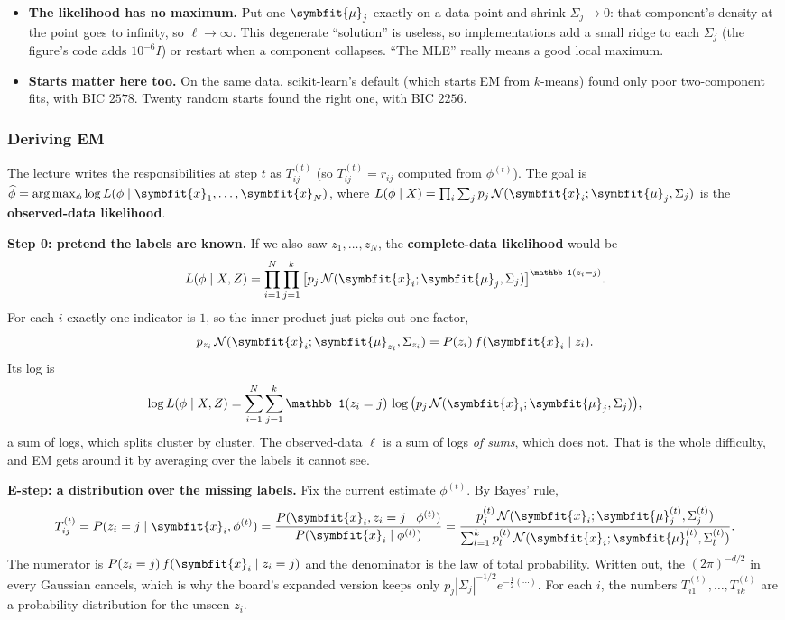 \documentclass[11pt]{article}
\newcommand{\bm}[1]{\symbfit{#1}}
\newcommand{\vx}{\bm{x}}
\begin{document}
\begin{careful}
\begin{itemize}[nosep,leftmargin=*]
\item \textbf{The likelihood has no maximum.} Put one $\bm\mu_j$ exactly on a data point and shrink $\Sigma_j\to0$: that component's density at the point goes to infinity, so $\ell\to\infty$. This degenerate ``solution'' is useless, so implementations add a small ridge to each $\Sigma_j$ (the figure's code adds $10^{-6}I$) or restart when a component collapses. ``The MLE'' really means a good local maximum.
\item \textbf{Starts matter here too.} On the same data, scikit-learn's default (which starts EM from $k$-means) found only poor two-component fits, with BIC $2578$. Twenty random starts found the right one, with BIC $2256$.
\end{itemize}
\end{careful}

\subsubsection{Deriving EM}\label{sec:emderiv}

The lecture writes the responsibilities at step $t$ as $T_{ij}^{(t)}$ (so $T_{ij}^{(t)}=r_{ij}$ computed from $\phi^{(t)}$). The goal is $\widehat\phi=\arg\max_\phi\log L(\phi\mid\vx_1,\dots,\vx_N)$, where $L(\phi\mid X)=\prod_i\sum_jp_j\,\mathcal N(\vx_i;\bm\mu_j,\Sigma_j)$ is the \textbf{observed-data likelihood}.

\textbf{Step 0: pretend the labels are known.} If we also saw $z_1,\dots,z_N$, the \textbf{complete-data likelihood} would be
\[
L(\phi\mid X,Z)=\prod_{i=1}^N\prod_{j=1}^k\big[p_j\,\mathcal N(\vx_i;\bm\mu_j,\Sigma_j)\big]^{\mathbb 1(z_i=j)} .
\]
For each $i$ exactly one indicator is $1$, so the inner product just picks out one factor,
\[
p_{z_i}\,\mathcal N(\vx_i;\bm\mu_{z_i},\Sigma_{z_i})=P(z_i)\,f(\vx_i\mid z_i).
\]
Its log is
\[
\log L(\phi\mid X,Z)=\sum_{i=1}^N\sum_{j=1}^k\mathbb 1(z_i=j)\,\log\big(p_j\,\mathcal N(\vx_i;\bm\mu_j,\Sigma_j)\big),
\]
a sum of logs, which splits cluster by cluster. The observed-data $\ell$ is a sum of logs \emph{of sums}, which does not. That is the whole difficulty, and EM gets around it by averaging over the labels it cannot see.

\textbf{E-step: a distribution over the missing labels.} Fix the current estimate $\phi^{(t)}$. By Bayes' rule,
\[
T_{ij}^{(t)}=P(z_i=j\mid\vx_i,\phi^{(t)})=\frac{P(\vx_i,z_i=j\mid\phi^{(t)})}{P(\vx_i\mid\phi^{(t)})}=\frac{p_j^{(t)}\,\mathcal N(\vx_i;\bm\mu_j^{(t)},\Sigma_j^{(t)})}{\sum_{l=1}^kp_l^{(t)}\,\mathcal N(\vx_i;\bm\mu_l^{(t)},\Sigma_l^{(t)})} .
\]
The numerator is $P(z_i=j)\,f(\vx_i\mid z_i=j)$ and the denominator is the law of total probability. Written out, the $(2\pi)^{-d/2}$ in every Gaussian cancels, which is why the board's expanded version keeps only $p_j|\Sigma_j|^{-1/2}e^{-\frac12(\cdots)}$. For each $i$, the numbers $T_{i1}^{(t)},\dots,T_{ik}^{(t)}$ are a probability distribution for the unseen $z_i$.
\end{document}
